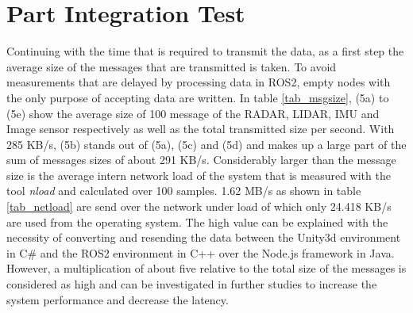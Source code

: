 	\section{Part Integration Test}\label{intpart}

	 Continuing with the time that is required to transmit the data, as a first step the average size of the messages that are transmitted is taken. To avoid measurements that are delayed by processing data in \ac{ROS2}, empty nodes with the only purpose of accepting data are written. In table \ref{tab_msgsize}, (5a) to (5e) show the average size of 100 message of the \ac{RADAR}, \ac{LIDAR}, \ac{IMU} and Image sensor respectively as well as the total transmitted size per second. With 285 KB/s, (5b) stands out of (5a), (5c) and (5d) and makes up a large part of the sum of messages sizes of about 291 KB/s. Considerably larger than the message size is the average intern network load of the system that is measured with the tool \textit{nload} and calculated over 100 samples. 1.62 MB/s as shown in table \ref{tab_netload} are send over the network under load of which only 24.418 KB/s are used from the operating system. The high value can be explained with the necessity of converting and resending the data between the Unity3d environment in C\# and the ROS2 environment in C++ over the Node.js framework in Java. However, a multiplication of about five relative to the total size of the messages is considered as high and can be investigated in further studies to increase the system performance and decrease the latency.\\
